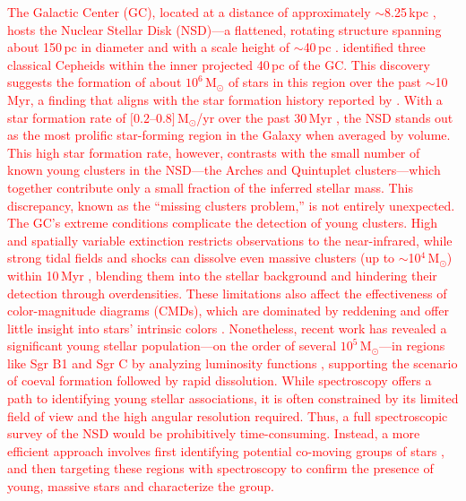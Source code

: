 \documentclass{aa} %
\begin{document}
	
	\textcolor{red}{The Galactic Center (GC), located at a distance of approximately $\sim$8.25\,kpc \citep{GC_distance_gravity}, hosts the Nuclear Stellar Disk (NSD)—a flattened, rotating structure spanning about 150\,pc in diameter and with a scale height of $\sim$40\,pc \citep{Sch2015, Ban_catalog, Launhardt_2002, Sormani2022}. \citet{three_cepheids} identified three classical Cepheids within the inner projected 40\,pc of the GC. This discovery suggests the formation of about $10^6$\,M$_\odot$ of stars in this region over the past $\sim$10\,Myr, a finding that aligns with the star formation history reported by \citet{paco_nature_2020}. With a star formation rate of $[0.2$--$0.8]$\,M$_\odot$/yr over the past 30\,Myr \citep{three_cepheids, paco_nature_2020}, the NSD stands out as the most prolific star-forming region in the Galaxy when averaged by volume.
	This high star formation rate, however, contrasts with the small number of known young clusters in the NSD—the Arches and Quintuplet clusters—which together contribute only a small fraction of the inferred stellar mass. This discrepancy, known as the “missing clusters problem,” is not entirely unexpected. The GC's extreme conditions complicate the detection of young clusters. High and spatially variable extinction \citep{extinction_los, paco_exctinction} restricts observations to the near-infrared, while strong tidal fields and shocks can dissolve even massive clusters (up to $\sim$10$^4$\,M$_\odot$) within 10\,Myr \citep{dissolve_GC, cluster_dissolution}, blending them into the stellar background and hindering their detection through overdensities. These limitations also affect the effectiveness of color-magnitude diagrams (CMDs), which are dominated by reddening and offer little insight into stars' intrinsic colors \citep{GNSI}. Nonetheless, recent work has revealed a significant young stellar population—on the order of several $10^5$\,M$_\odot$—in regions like Sgr B1 and Sgr C by analyzing luminosity functions \citep{Paco_B1, Paco_SgrC}, supporting the scenario of coeval formation followed by rapid dissolution.
	While spectroscopy offers a path to identifying young stellar associations, it is often constrained by its limited field of view and the high angular resolution required. Thus, a full spectroscopic survey of the NSD would be prohibitively time-consuming. Instead, a more efficient approach involves first identifying potential co-moving groups of stars \citep[e.g.,][]{Ban_cluster, comuving_yo}, and then targeting these regions with spectroscopy to confirm the presence of young, massive stars and characterize the group.
}
\end{document}
